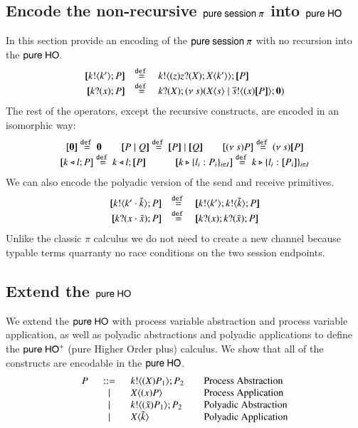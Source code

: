 \subsection{Encode the non-recursive $\mathsf{pure\ session\ }\pi$ into $\mathsf{pure\ HO}$}
In this section provide an encoding of the
$\mathsf{pure\ session\ }\pi$ with no recursion into the $\mathsf{pure\ HO}$.
%
\[
	\begin{array}{rcl}
		\map{\bout{k}{k'} P}	&\defeq&	\bout{k}{ \abs{z}{\binp{z}{X} \appl{X}{k'}} } \map{P} \\
		\map{\binp{k}{x} P}	&\defeq&	\binp{k}{X} \newsp{s}{\appl{X}{s} \Par \bout{\dual{s}}{\abs{x} \map{P}} \inact}\\
	\end{array}
\]
%
The rest of the operators, except the recursive constructs, are encoded in an isomorphic way:
\[
	\begin{array}{c}
		\map{\inact} \defeq \inact \qquad \map{P\Par Q} \defeq \map{P} \Par \map{Q} \qquad \map{\news{s} P} \defeq \news{s} \map{P}\\
		\map{\bsel{k}{l} P} \defeq \bsel{k}{l} \map{P} \qquad \quad \map{\bbra{k}{l_i:P_i}_{i \in I}} \defeq \bbra{k}{l_i: \map{P_i}}_{i \in I}
	\end{array}
\]
We can also encode the polyadic version of the send and receive primitives.
%
\[
	\begin{array}{rcl}
		\map{\bout{k}{k' \cat \tilde{k}} P}	&\defeq&	\map{\bout{k}{k'} \bout{k}{\tilde{k}} P}\\
		\map{\binp{k}{x \cat \tilde{x}} P}	&\defeq&	\map{\binp{k}{x} \binp{k}{\tilde{x}} P}\\
	\end{array}
\]
%
Unlike the classic $\pi$ calculus we do not need to create a new channel because typable terms
quarranty no race conditions on the two session endpoints.

\subsection{Extend the $\mathsf{pure\ HO}$}

We extend the $\mathsf{pure\ HO}$ with process variable abstraction and process variable application,
as well as polyadic abstractions and polyadic applications to define the
$\mathsf{pure\ HO}^+$ (pure Higher Order plus) calculus. We show that all of the
constructs are encodable in the $\mathsf{pure\ HO}$.
%
\[
	\begin{array}{rclcl}
		P &\;\;::=\;\;&	k ! \langle (X)P_1 \rangle ; P_2 & & \textrm{Process Abstraction}\\
		&\;\;\;|\;\;\;&	X\langle (x)P \rangle & & \textrm{Process Application} \\
		&\;\;\;|\;\;\;&	k ! \langle (\tilde{x})P_1 \rangle ; P_2 & & \textrm{Polyadic Abstraction}\\
		&\;\;\;|\;\;\;&	X\langle \tilde{k} \rangle & & \textrm{Polyadic Application}\\
	\end{array}
\]
